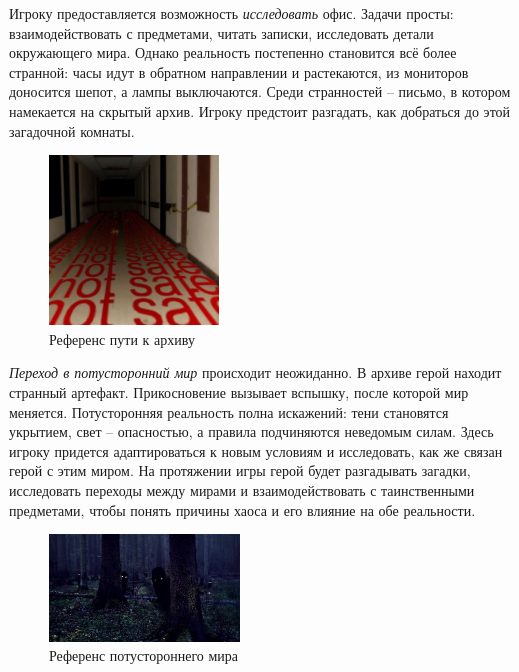 \documentclass{article}
\begin{document}
	Игроку предоставляется возможность \textit{исследовать} офис. Задачи просты: взаимодействовать с предметами, читать записки, исследовать детали окружающего мира. Однако реальность постепенно становится всё более странной: часы идут в обратном направлении и растекаются, из мониторов доносится шепот, а лампы выключаются. Среди странностей – письмо, в котором намекается на скрытый архив. Игроку предстоит разгадать, как добраться до этой загадочной комнаты.
	
	\begin{figure}[H]
		\centering
		\includegraphics[width=0.4\textwidth]{images/pathtoarchive.jpg}
		\caption{Референс пути к архиву}
		\label{fig:path}
	\end{figure}
	
	\newpage
	 \textit{Переход в потусторонний мир} происходит неожиданно. В архиве герой находит странный артефакт. Прикосновение вызывает вспышку, после которой мир меняется. Потусторонняя реальность полна искажений: тени становятся укрытием, свет – опасностью, а правила подчиняются неведомым силам. Здесь игроку придется адаптироваться к новым условиям и исследовать, как же связан герой с этим миром. На протяжении игры герой будет разгадывать загадки, исследовать переходы между мирами и взаимодействовать с таинственными предметами, чтобы понять причины хаоса и его влияние на обе реальности.
	 
	 \begin{figure}[h]
	 	\centering
	 	\includegraphics[width=0.45\textwidth]{images/otherworld.jpg}
	 	\caption{Референс потустороннего мира}
	 	\label{fig:otherworld}
	 \end{figure}
	 
\end{document}
